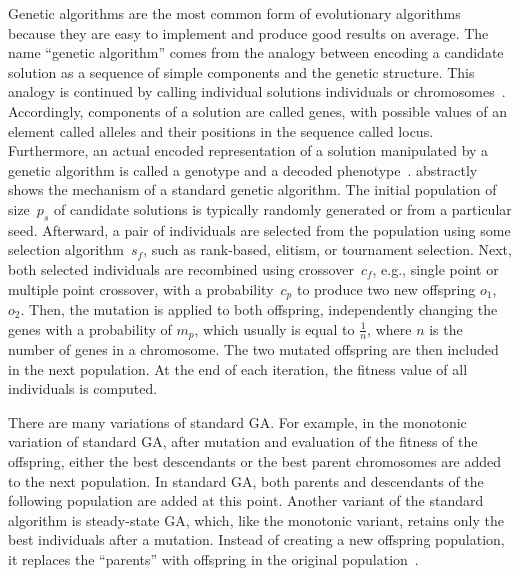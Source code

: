 \documentclass[paper=a4,%
  twoside,%
  BCOR4mm,%
  abstract=true,%
  toc=bibliography,%
  chapterprefix=true,%
  toc=bibliographynumbered,%
  open=right,%
  english,%
  pagesize=pdftex]{scrreprt}
\begin{document}
Genetic algorithms are the most common form of evolutionary algorithms because they are easy to implement and produce good results on average. The name ``genetic algorithm'' comes from the analogy between encoding a candidate solution as a sequence of simple components and the genetic structure. This analogy is continued by calling individual solutions individuals or chromosomes~\cite{Campos2017}. Accordingly, components of a solution are called genes, with possible values of an element called alleles and their positions in the sequence called locus. Furthermore, an actual encoded representation of a solution manipulated by a genetic algorithm is called a genotype and a decoded phenotype~\cite{McMinn_2004}.  abstractly shows the mechanism of a standard genetic algorithm. The initial population of size~$p_s$ of candidate solutions is typically randomly generated or from a particular seed. Afterward, a pair of individuals are selected from the population using some selection algorithm~$s_f$, such as rank-based, elitism, or tournament selection. Next, both selected individuals are recombined using crossover~$c_f$, e.g., single point or multiple point crossover, with a probability~$c_p$ to produce two new offspring $o_1$, $o_2$. Then, the mutation is applied to both offspring, independently changing the genes with a probability of $m_p$, which usually is equal to $\frac{1}{n}$, where $n$ is the number of genes in a chromosome. The two mutated offspring are then included in the next population. At the end of each iteration, the fitness value of all individuals is computed.  

There are many variations of standard \ac{GA}. For example, in the monotonic variation of standard \ac{GA}, after mutation and evaluation of the fitness of the offspring, either the best descendants or the best parent chromosomes are added to the next population. In standard \ac{GA}, both parents and descendants of the following population are added at this point. Another variant of the standard algorithm is steady-state \ac{GA}, which, like the monotonic variant, retains only the best individuals after a mutation. Instead of creating a new offspring population, it replaces the ``parents'' with offspring in the original population~\cite{Campos2017}.
\end{document}

